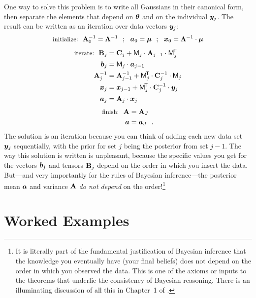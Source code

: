 One way to solve this problem is to write all Gaussians in their canonical form, then separate the elements that depend on $\boldsymbol{\theta}$ and on the individual $\boldsymbol{y}_j$.
The result can be written as an iteration over data vectors $\boldsymbol{y}_j$:
\begin{equation}
  \mbox{\small initialize:}~~
  \mathbf{A}_0^{-1} = \mathbf{\Lambda}^{-1} ~~;~~ \boldsymbol{a}_0 = \boldsymbol{\mu} ~~;~~ \boldsymbol{x}_0 = \mathbf{\Lambda}^{-1}\cdot\boldsymbol{\mu}
\end{equation}
\begin{align}
  \mbox{\small iterate:}~~
  \mathbf{B}_j &= \mathbf{C}_j + \mathsf{M}_j \cdot \mathbf{A}_{j-1} \cdot \mathsf{M}_j^{\!\mathsf{T}\!} \\
  \boldsymbol{b}_j &= \mathsf{M}_j \cdot \boldsymbol{a}_{j-1} \\
  \mathbf{A}_j^{-1} &= \mathbf{A}_{j-1}^{-1} + \mathsf{M}_j^{\!\mathsf{T}\!} \cdot \mathbf{C}_j^{-1} \cdot \mathsf{M}_j \\
  \boldsymbol{x}_j &= \boldsymbol{x}_{j-1} + \mathsf{M}_j^{\!\mathsf{T}\!} \cdot \mathbf{C}_j^{-1} \cdot \boldsymbol{y}_j \\
  \boldsymbol{a}_j &= \mathbf{A}_j \cdot \boldsymbol{x}_j
\end{align}
\begin{align}
  \mbox{\small finish:}~~
  \mathbf{A} &= \mathbf{A}_J \\
  \boldsymbol{a} &= \boldsymbol{a}_J
  ~~.
\end{align}
The solution is an iteration because you can think of adding each new data
set $\boldsymbol{y}_j$ sequentially, with the prior for set $j$ being the posterior from
set $j-1$.
The way this solution is written is unpleasant, because the specific values you get for the
vectors $\boldsymbol{b}_j$ and tensors $\mathbf{B}_j$ depend on the order in which you insert the data.
But---and very importantly for the rules of Bayesian inference---the posterior
mean $\boldsymbol{a}$ and variance $\mathbf{A}$ \emph{do not depend} on the order!\footnote{It
  is literally part of the fundamental justification of Bayesian inference
  that the knowledge you eventually have (your final beliefs) does not depend
  on the order in which you observed the data. This is one of the axioms or inputs
  to the theorems that underlie the consistency of Bayesian reasoning.
  There is an illuminating discussion of all this in Chapter~1 of \cite{jaynes}.}


\section{Worked Examples}\label{sec:examples}

